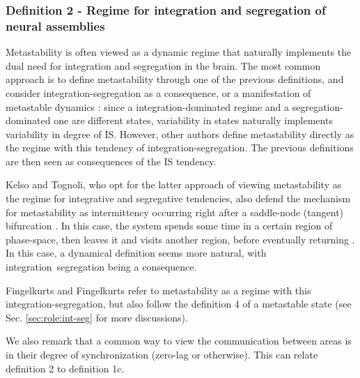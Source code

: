 \documentclass[preprint,superscriptaddress,showpacs,amsmath,amssymb,aps,pre,floatfix]{revtex4-1}
\theoremstyle{definition}
\begin{document}
\subsubsection{Definition 2 - Regime for integration and segregation of neural assemblies}
Metastability is often viewed as a dynamic regime that naturally implements the dual need for integration and segregation in the brain. 
The most common approach is to define metastability through one of the previous definitions, and consider integration-segregation as a consequence, or a manifestation of metastable dynamics \cite{kozma_2016}: since a integration-dominated regime and a segregation-dominated one are different states, variability in states naturally implements variability in degree of IS. 
However, other authors \cite{fingelkurts_2001, fingelkurts_2004, kelso_2017, tognoli_2014, tognoli_2014a, bressler_2016, kelso_2012, hellyer_2015} define metastability directly as the regime with this tendency of integration-segregation. The previous definitions are then seen as consequences of the IS tendency.

Kelso and Tognoli, who opt for the latter approach of viewing metastability as the regime for integrative and segregative tendencies, also defend the mechanism for metastability as intermittency occurring right after a saddle-node (tangent) bifurcation \cite{tognoli_2014, bressler_2016}. In this case, the system spends some time in a certain region of phase-space, then leaves it and visits another region, before eventually returning \cite{kelso_1991}. In this case, a dynamical definition seems more natural, with integration~segregation being a consequence. %

Fingelkurts and Fingelkurts refer to metastability as a regime with this integration-segregation, but also follow the definition 4 of a metastable state (see Sec. \ref{sec:role:int-seg} for more discussions).

We also remark that a common way to view the communication between areas is in their degree of synchronization (zero-lag or otherwise). This can relate definition 2 to definition 1c.
\end{document}
